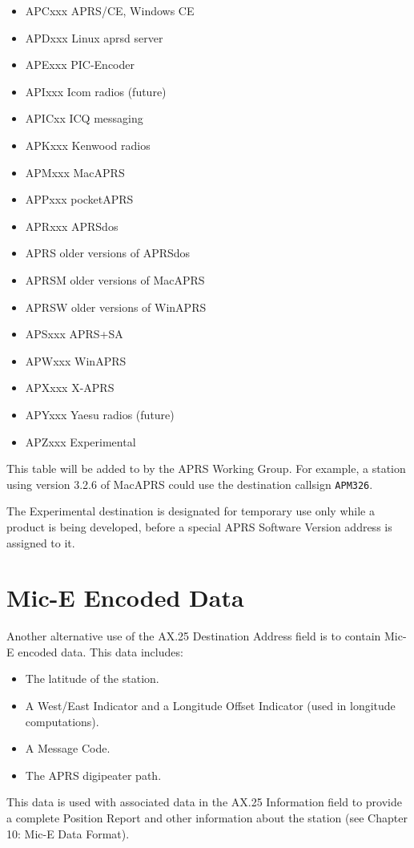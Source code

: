 \begin{itemize}

\item APCxxx APRS/CE, Windows CE
\item APDxxx Linux aprsd server
\item APExxx PIC-Encoder
\item APIxxx Icom radios (future)
\item APICxx ICQ messaging
\item APKxxx Kenwood radios
\item APMxxx MacAPRS
\item APPxxx pocketAPRS
\item APRxxx APRSdos
\item APRS older versions of APRSdos
\item APRSM older versions of MacAPRS
\item APRSW older versions of WinAPRS
\item APSxxx APRS+SA
\item APWxxx WinAPRS
\item APXxxx X-APRS
\item APYxxx Yaesu radios (future)
\item APZxxx Experimental

\end{itemize}

This table will be added to by the APRS Working Group.
For example, a station using version 3.2.6 of MacAPRS could use the
destination callsign \texttt{APM326}.

The Experimental destination is designated for temporary use only while a
product is being developed, before a special APRS Software Version address
is assigned to it.


\section {Mic-E Encoded Data}

Another alternative use of the AX.25 Destination Address field is to contain
Mic-E encoded data. This data includes:

\begin{itemize}

\item The latitude of the station.

\item A West/East Indicator and a Longitude Offset Indicator (used in
longitude computations).

\item A Message Code.

\item The APRS digipeater path.

\end{itemize}
This data is used with associated data in the AX.25 Information field to
provide a complete Position Report and other information about the station
(see Chapter 10: Mic-E Data Format).

